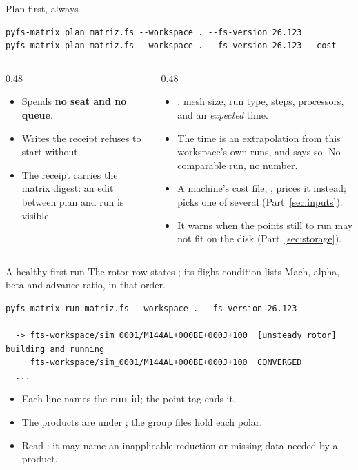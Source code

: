 \begin{frame}[fragile]{Plan first, always}
\begin{lstlisting}[style=ftsbase]
pyfs-matrix plan matriz.fs --workspace . --fs-version 26.123
pyfs-matrix plan matriz.fs --workspace . --fs-version 26.123 --cost
\end{lstlisting}
\begin{columns}[T]
\begin{column}{0.48\textwidth}
\begin{itemize}
  \item Spends \textbf{no seat and no queue}.
  \item Writes the receipt  refuses to start without.
  \item The receipt carries the matrix digest: an edit between plan and run
        is visible.
\end{itemize}
\end{column}
\begin{column}{0.48\textwidth}
\begin{itemize}
  \item {}: mesh size, run type, steps, processors, and an
        \emph{expected} time.
  \item The time is an extrapolation from this workspace's own runs, and says
        so. No comparable run, no number.
  \item A machine's cost file, , prices it
        instead;  picks one of several
        (Part~\ref{sec:inputs}).
  \item It warns when the points still to run may not fit on the disk
        (Part~\ref{sec:storage}).
\end{itemize}
\end{column}
\end{columns}
\end{frame}

\begin{frame}[fragile]{A healthy first run}
\small The rotor row states ; its flight condition
lists Mach, alpha, beta and advance ratio, in that order.
\begin{lstlisting}[style=ftsbase]
pyfs-matrix run matriz.fs --workspace . --fs-version 26.123

  -> fts-workspace/sim_0001/M144AL+000BE+000J+100  [unsteady_rotor]  building and running
     fts-workspace/sim_0001/M144AL+000BE+000J+100  CONVERGED
  ...
\end{lstlisting}
\begin{itemize}
  \item Each line names the \textbf{run id}; the point tag ends it.
  \item The products are under ; the  group files hold each polar.
  \item Read : it may name an inapplicable reduction or missing
        data needed by a product.
\end{itemize}
\end{frame}

